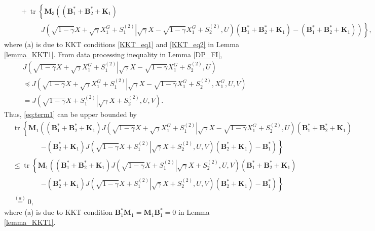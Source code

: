 \documentclass[journal,final, onecolumn]{IEEEtran}
\DeclareMathOperator{\tr}{tr}
\begin{document}
\begin{align}
&\quad +\tr \left\{     \boldsymbol{M}_{3} \left(  \left( \boldsymbol{B}_1^{*}+ \boldsymbol{B}_2^{*} + \boldsymbol{K}_{1}     \right) \right.\right. \nonumber \\
& \qquad\qquad\left.\left.    J   \left( \left. \sqrt{1-\gamma}X+\sqrt{\gamma}X^{G}_{1}+S^{(2)}_{1} \right| \sqrt{\gamma}X-\sqrt{1-\gamma}X_{1}^{G}+S^{(2)}_{2}, U  \right) \left( \boldsymbol{B}_1^{*}+ \boldsymbol{B}_2^{*} + \boldsymbol{K}_{1}     \right)  -\left(  \boldsymbol{B}_1^{*}+\boldsymbol{B}_2^{*} + \boldsymbol{K}_{1}     \right)\right)     \right\}, \label{eq:term3}
\end{align}
where (a) is due to KKT conditions \eqref{KKT_eq1} and \eqref{KKT_eq2} in Lemma \ref{lemma_KKT1}.
From data processing inequality in Lemma \ref{DP_FI},
\begin{align}
&J   \left(  \sqrt{1-\gamma}X+\sqrt{\gamma}X^{G}_{1}+S^{(2)}_{1} \left|   \sqrt{\gamma}X-\sqrt{1-\gamma}X_{1}^{G}+S^{(2)}_{2}, U \right. \right)\nonumber \\
& \preceq J   \left(  \sqrt{1-\gamma}X+\sqrt{\gamma}X^{G}_{1}+S^{(2)}_{1} \left|   \sqrt{\gamma}X-\sqrt{1-\gamma}X_{1}^{G}+S^{(2)}_{2}, X^{G}_{1},U,V \right. \right) \\
&= J   \left(  \sqrt{1-\gamma}X+S^{(2)}_{1} \left|   \sqrt{\gamma}X+S^{(2)}_{2},U,V \right. \right).
\end{align}
Thus, \eqref{eq:term1} can be upper bounded by
\begin{align}
&\tr \left\{ \boldsymbol{M}_1   \left(  \left( \boldsymbol{B}_1^{*}+ \boldsymbol{B}_2^{*} + \boldsymbol{K}_{1}     \right) J   \left(  \sqrt{1-\gamma}X+\sqrt{\gamma}X^{G}_{1}+S^{(2)}_{1} \left|   \sqrt{\gamma}X-\sqrt{1-\gamma}X_{1}^{G}+S^{(2)}_{2}, U \right. \right)    \left( \boldsymbol{B}_1^{*}+ \boldsymbol{B}_2^{*} + \boldsymbol{K}_{1}     \right) \right.\right. \nonumber \\
&\qquad \qquad\left.\left. -   \left( \boldsymbol{B}_2^{*} + \boldsymbol{K}_{1}     \right) J   \left(  \sqrt{1-\gamma}X+S^{(2)}_{1} \left|   \sqrt{\gamma}X+S^{(2)}_{2}, U,V \right. \right)    \left(  \boldsymbol{B}_2^{*} + \boldsymbol{K}_{1}     \right) - \boldsymbol{B}_1^{*}                                   \right)\right\}  \\
& \leq \tr \left\{ \boldsymbol{M}_1   \left(  \left( \boldsymbol{B}_1^{*}+ \boldsymbol{B}_2^{*} + \boldsymbol{K}_{1}     \right) J   \left(  \sqrt{1-\gamma}X+S^{(2)}_{1} \left|   \sqrt{\gamma}X+S^{(2)}_{2}, U, V \right. \right)    \left( \boldsymbol{B}_1^{*}+ \boldsymbol{B}_2^{*} + \boldsymbol{K}_{1}     \right) \right.\right. \nonumber \\
&\qquad \qquad\left.\left. -   \left( \boldsymbol{B}_2^{*} + \boldsymbol{K}_{1}     \right) J   \left(  \sqrt{1-\gamma}X+S^{(2)}_{1} \left|   \sqrt{\gamma}X+S^{(2)}_{2}, U,V \right. \right)    \left(  \boldsymbol{B}_2^{*} + \boldsymbol{K}_{1}     \right) - \boldsymbol{B}_1^{*}                                   \right)\right\}\\
&\overset{(a)}=0,\label{term1}
\end{align}
where (a) is due to KKT condition $\boldsymbol{B}_{1}^{*}\boldsymbol{M}_{1} =\boldsymbol{M}_{1}\boldsymbol{B}_{1}^{*}=0$ in Lemma \ref{lemma_KKT1}.
\end{document}
